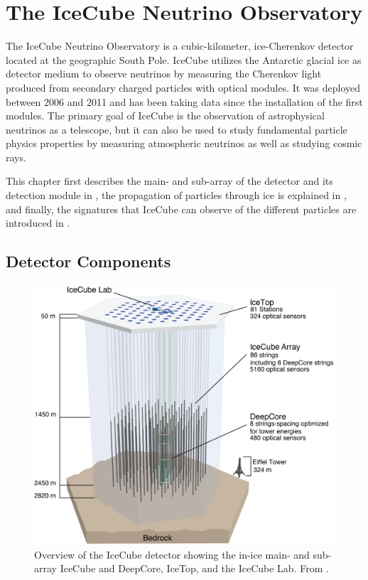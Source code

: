 \setchapterpreamble[u]{\margintoc}


\chapter{The IceCube Neutrino Observatory}


The IceCube Neutrino Observatory  is a cubic-kilometer, ice-Cherenkov detector located at the geographic South Pole. IceCube utilizes the Antarctic glacial ice as detector medium to observe neutrinos by measuring the Cherenkov light produced from secondary charged particles with optical modules. It was deployed between 2006 and 2011 and has been taking data since the installation of the first modules. The primary goal of IceCube is the observation of astrophysical neutrinos as a telescope, but it can also be used to study fundamental particle physics properties by measuring atmospheric neutrinos as well as studying cosmic rays.

This chapter first describes the main- and sub-array of the detector and its detection module in , the propagation of particles through ice is explained in , and finally, the signatures that IceCube can observe of the different particles are introduced in .


\section{Detector Components} 

\begin{figure}[h]
    \includegraphics{figures/icecube_deepcore/IceCubeArray_slim.png}
	\caption[IceCube overview]{Overview of the IceCube detector showing the in-ice main- and sub-array IceCube and DeepCore, IceTop, and the IceCube Lab. From \cite{2017JInst..12P3012A_Instrumentation_Systems}.}
\end{figure}

